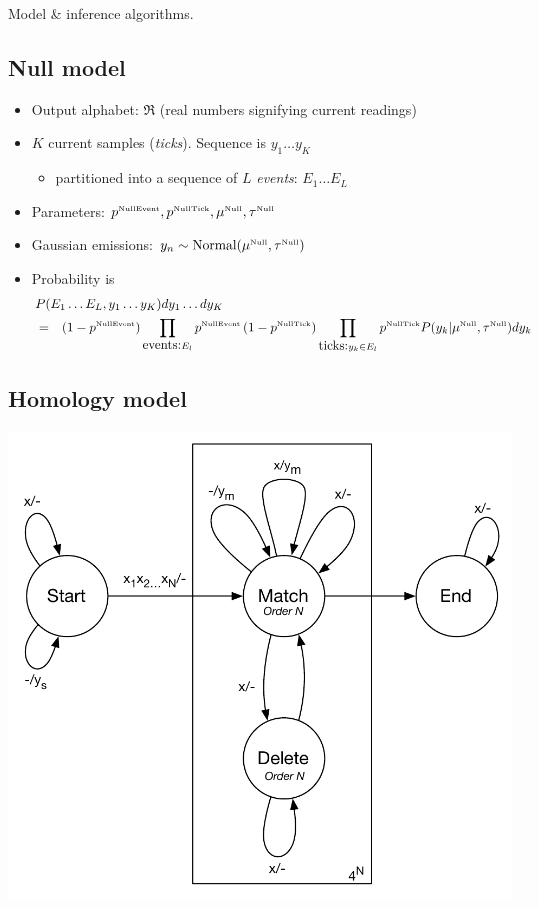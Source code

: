 \documentclass[10pt]{article}
\begin{document}
Model \& inference algorithms.

\newcommand\paramlabel[1]{\mbox{\tiny #1}}

\subsection{Null model}

\begin{itemize}
\item Output alphabet: $\Re$ (real numbers signifying current readings)
\item $K$ current samples ({\em ticks}). Sequence is $y_1 \ldots y_K$
 \begin{itemize}
 \item partitioned into a sequence of $L$ {\em events}: $E_1 \ldots E_L$
 \end{itemize}
\item Parameters: $p^{\paramlabel{NullEvent}},p^{\paramlabel{NullTick}},\mu^{\paramlabel{Null}},\tau^{\paramlabel{Null}}$
\item Gaussian emissions: $y_n \sim \mbox{Normal}(\mu^{\paramlabel{Null}},\tau^{\paramlabel{Null}})$
\item Probability is
\begin{eqnarray*}
  \lefteqn{P(E_1 \ldots E_L, y_1 \ldots y_K) dy_1 \ldots dy_K} \\
& = & \left( 1 - p^{\paramlabel{NullEvent}} \right)
\prod_{\mbox{events:} E_l} p^{\paramlabel{NullEvent}} \left( 1 - p^{\paramlabel{NullTick}} \right)
\prod_{\mbox{ticks:} y_k \in E_l} p^{\paramlabel{NullTick}} P(y_k|\mu^{\paramlabel{Null}},\tau^{\paramlabel{Null}}) dy_k
\end{eqnarray*}
\end{itemize}


\subsection{Homology model}

\includegraphics[width=\textwidth]{figs/Transducer.pdf}
\end{document}
